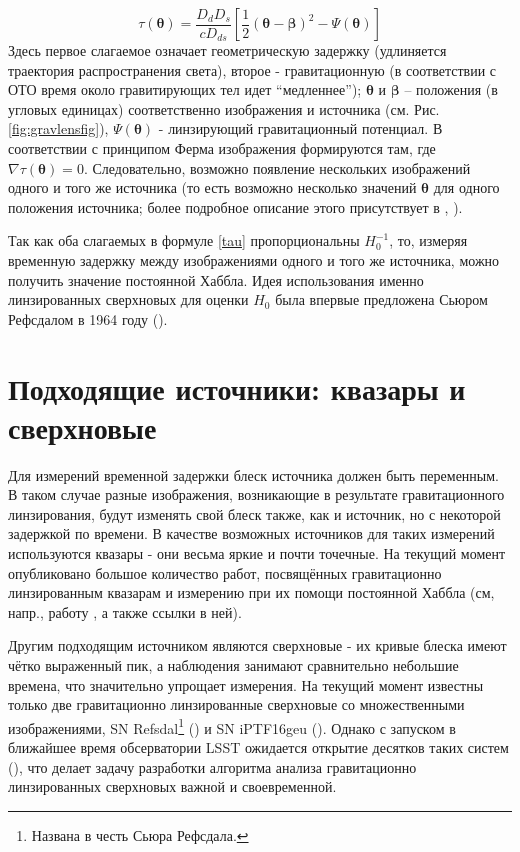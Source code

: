 \begin{equation}\label{tau}
\tau(\boldsymbol{\theta})=\frac{D_{d} D_{s}}{c D_{d s}}\left[\frac{1}{2}(\boldsymbol{\theta}-\boldsymbol{\beta})^{2}-\Psi(\boldsymbol{\theta})\right]
\end{equation}
Здесь первое слагаемое означает геометрическую задержку (удлиняется траектория распространения света), второе - гравитационную (в соответствии с ОТО время около гравитирующих тел идет “медленнее”); $\boldsymbol{\theta}$ и $\boldsymbol{\beta}$ -- положения (в угловых единицах) соответственно изображения и источника (см. Рис.\ref{fig:gravlensfig}), $\Psi(\boldsymbol{\theta})$ - линзирующий гравитационный потенциал. В соответствии с принципом Ферма изображения формируются там, где $\nabla \tau (\boldsymbol{\theta}) = 0$. Следовательно, возможно появление нескольких изображений  одного и того же источника (то есть возможно несколько значений $\boldsymbol{\theta}$ для одного положения источника; более подробное описание этого присутствует в \cite{gravlensbook}, \cite{gl_all}).

Так как оба слагаемых в формуле \eqref{tau} пропорциональны $H_0^{-1}$, то, измеряя временную задержку между изображениями одного и того же источника, можно получить значение постоянной Хаббла. Идея использования именно линзированных сверхновых для оценки $H_0$ была впервые предложена Сьюром Рефсдалом в 1964 году (\cite{refsdal1964}).

\section{Подходящие источники: квазары и сверхновые}

Для измерений временной задержки блеск источника должен быть переменным. В таком случае разные изображения, возникающие в результате гравитационного линзирования, будут изменять свой блеск также, как и источник, но с некоторой задержкой по времени. В качестве возможных источников для таких измерений используются квазары - они весьма яркие и почти точечные. На текущий момент опубликовано большое количество работ, посвящённых гравитационно линзированным квазарам и измерению при их помощи постоянной Хаббла (см, напр., работу \cite{holicow}, а также ссылки в ней). 

Другим подходящим источником являются сверхновые - их кривые блеска имеют чётко выраженный пик, а наблюдения занимают сравнительно небольшие времена, что значительно упрощает измерения. На текущий момент известны только две гравитационно линзированные сверхновые со множественными изображениями, SN Refsdal\footnote{Названа в честь Сьюра Рефсдала.} (\cite{kelly2014}) и SN iPTF16geu (\cite{goobar2017}). Однако с запуском в ближайшее время обсерватории LSST ожидается открытие десятков таких систем (\cite{pierelrodney2019}), что делает задачу разработки алгоритма анализа гравитационно линзированных сверхновых важной и своевременной.

